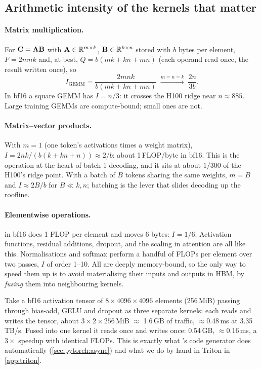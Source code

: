 \subsection{Arithmetic intensity of the kernels that matter}
\paragraph{Matrix multiplication.} For $\mathbf{C}=\mathbf{A}\mathbf{B}$ with $\mathbf{A}\in\mathbb{R}^{m\times k}$, $\mathbf{B}\in\mathbb{R}^{k\times n}$
stored with $b$ bytes per element, $F=2mnk$ and, at best, $Q=b(mk+kn+mn)$ (each operand read once, the result
written once), so
\begin{equation}
I_{\text{GEMM}} = \frac{2mnk}{b(mk+kn+mn)}\;\xrightarrow{m=n=k}\;\frac{2n}{3b}.
\end{equation}
In bf16 a square GEMM has $I=n/3$: it crosses the H100 ridge near $n\approx885$. Large training GEMMs are
compute-bound; small ones are not.

\paragraph{Matrix--vector products.} With $m=1$ (one token's activations times a weight matrix),
$I=2nk/(b(k+kn+n))\approx 2/b$: about 1\,FLOP/byte in bf16. This is the operation at the heart of batch-1
decoding, and it sits at about $1/300$ of the H100's ridge point. With a batch of $B$ tokens sharing the same
weights, $m=B$ and $I\approx 2B/b$ for $B\ll k,n$; batching is the lever that slides decoding up the roofline.

\paragraph{Elementwise operations.}  in bf16 does 1 FLOP per element and moves 6 bytes:
$I=1/6$. Activation functions, residual additions, dropout, and the scaling in attention are all like this.
Normalisations and softmax perform a handful of FLOPs per element over two passes, $I$ of order 1--10. All are
deeply memory-bound, so the only way to speed them up is to avoid materialising their inputs and outputs in
HBM, by \emph{fusing} them into neighbouring kernels.

\begin{napkinmath}
Take a bf16 activation tensor of $8\times4096\times4096$ elements (256\,MiB) passing through bias-add, GELU and
dropout as three separate kernels: each reads and writes the tensor, about $3\times2\times256$\,MiB $\approx$ 1.6\,GB of
traffic, $\approx$0.48\,ms at 3.35\,TB/s. Fused into one kernel it reads once and writes once: 0.54\,GB,
$\approx$0.16\,ms, a $3\times$ speedup with identical FLOPs. This is exactly what 's
code generator does automatically (\cref{sec:pytorch:async}) and what we do by hand in Triton in
\cref{app:triton}.
\end{napkinmath}

